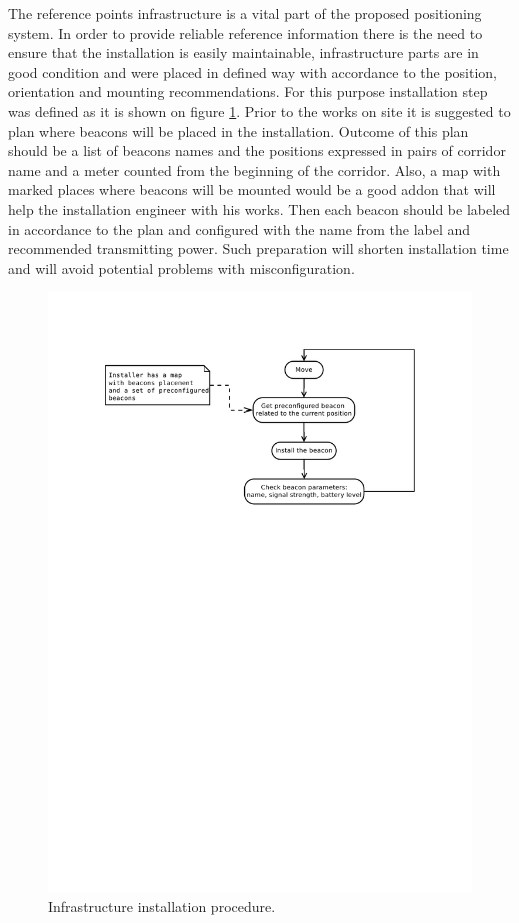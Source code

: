 \documentclass[../main.tex]{subfiles}
\begin{document}
The reference points infrastructure is a vital part of the proposed positioning system. In order to provide reliable reference information there is the need to ensure that the installation is easily maintainable, infrastructure parts are in good condition and were placed in defined way with accordance to the position, orientation and mounting recommendations. For this purpose installation step was defined as it is shown on figure \ref{fig:infrastructure_installation_proc}. Prior to the works on site it is suggested to plan where beacons will be placed in the installation. Outcome of this plan should be a list of beacons names and the positions expressed in pairs of corridor name and a meter counted from the beginning of the corridor. Also, a map with marked places where beacons will be mounted would be a good addon that will help the installation engineer with his works. Then each beacon should be labeled in accordance to the plan and configured with the name from the label and recommended transmitting power. Such preparation will shorten installation time and will avoid potential problems with misconfiguration.

\begin{figure}[!htbp]
\includegraphics[width=\textwidth, trim={0 18cm 0 0},clip]{pictures/infrastructure_installation_proc.pdf}
\centering
\caption{Infrastructure installation procedure.}
\label{fig:infrastructure_installation_proc}
\end{figure}
\end{document}
